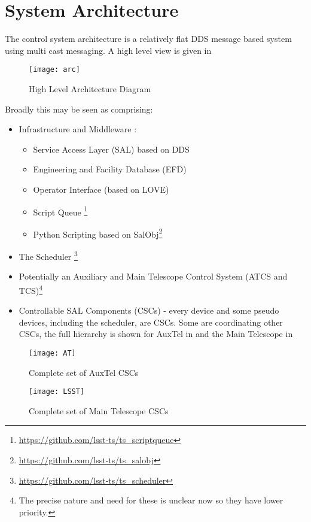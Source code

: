 \section{System Architecture} \label{sec:sysarc}


The control system architecture is a relatively flat DDS message based system using multi cast messaging. A high level view is given in 



\begin{figure}
\begin{center}
\texttt{[image: arc]}
\caption{High Level Architecture Diagram\label{fig:arc}}
\end{center}
\end{figure}

Broadly this may be seen as comprising:
\begin{itemize}
\item Infrastructure and Middleware :
	\begin{itemize}
	\item Service Access Layer (SAL) based on DDS
	\item Engineering and Facility Database (EFD)
	\item Operator Interface (based on LOVE)
	\item Script Queue  \footnote{\url{https://github.com/lsst-ts/ts_scriptqueue}}
	\item Python Scripting based on SalObj\footnote{\url{https://github.com/lsst-ts/ts_salobj}}
	\end{itemize}
\item The Scheduler \footnote{\url{https://github.com/lsst-ts/ts_scheduler}}
\item Potentially an Auxiliary and Main Telescope Control System (ATCS and TCS)\footnote {The precise nature and need for these is unclear now so they have lower priority.}
\item Controllable SAL Components (CSCs) - every device and some pseudo devices, including the scheduler, are CSCs. Some are coordinating other CSCs, the full hierarchy is shown for AuxTel in  and the Main Telescope in 
\end{itemize}

\begin{figure}
\begin{center}
\texttt{[image: AT]}
\caption{Complete set of AuxTel CSCs\label{fig:atcscs}}
\end{center}
\end{figure}

\begin{figure}
\begin{center}
\texttt{[image: LSST]}
\caption{Complete set of Main Telescope CSCs\label{fig:mtcscs}}
\end{center}
\end{figure}

